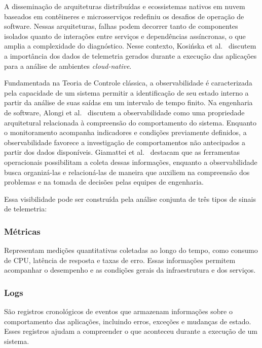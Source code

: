 A disseminação de arquiteturas distribuídas e ecossistemas nativos em nuvem baseados em
contêineres e microsserviços redefiniu os desafios de operação de software. Nessas arquiteturas, falhas podem decorrer tanto de componentes isolados quanto de
interações entre serviços e dependências assíncronas, o que amplia a complexidade do
diagnóstico. Nesse contexto, Kosińska et al.~ discutem a importância
dos dados de telemetria gerados durante a execução das aplicações para a análise de
ambientes \emph{cloud-native}.

Fundamentada na Teoria de Controle clássica, a observabilidade é caracterizada pela
capacidade de um sistema permitir a identificação de seu estado interno a partir da
análise de suas saídas em um intervalo de tempo finito. Na engenharia de software, Alongi et al.~ discutem a observabilidade
como uma propriedade arquitetural relacionada à compreensão do comportamento do sistema.
Enquanto o monitoramento acompanha indicadores e condições previamente definidos,
a observabilidade favorece a investigação de comportamentos não antecipados a partir
dos dados disponíveis. Giamattei et al.~ destacam que as
ferramentas operacionais possibilitam a coleta dessas informações, enquanto a observabilidade busca
organizá-las e relacioná-las de maneira que auxiliem na compreensão dos problemas e na
tomada de decisões pelas equipes de engenharia.

Essa visibilidade pode ser construída pela análise conjunta de três tipos de sinais
de telemetria:

\begin{samepage}
\subsubsection{Métricas}\label{sec:metricas}

Representam medições quantitativas coletadas ao longo do tempo, como
consumo de CPU, latência de resposta e taxas de erro. Essas informações permitem
acompanhar o desempenho e as condições gerais da infraestrutura e dos serviços.
\par
\end{samepage}

\begin{samepage}
\subsubsection{Logs}\label{sec:logs}

São registros cronológicos de eventos que armazenam informações sobre o
comportamento das aplicações, incluindo erros, exceções e mudanças de estado. Esses
registros ajudam a compreender o que aconteceu durante a execução de um sistema.
\par
\end{samepage}

